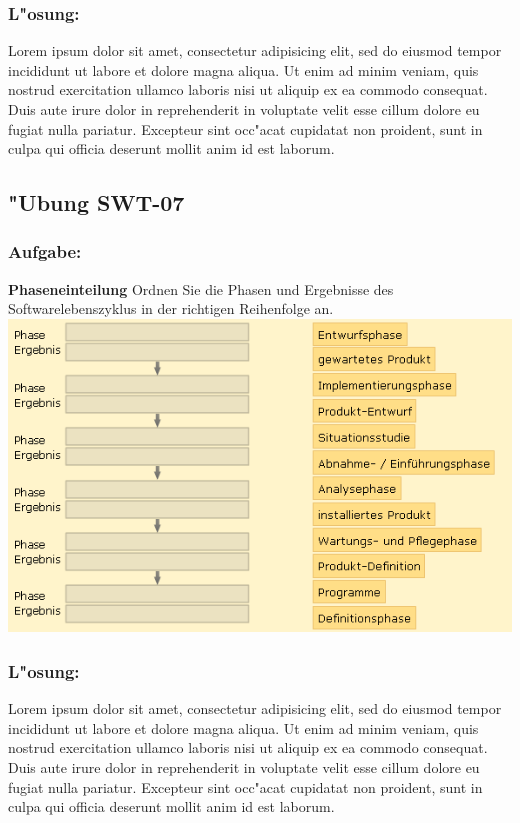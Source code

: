 \subsubsection*{L"osung:}
Lorem ipsum dolor sit amet, consectetur adipisicing elit, sed do eiusmod tempor incididunt ut labore et dolore magna aliqua. Ut enim ad minim veniam, quis nostrud exercitation ullamco laboris nisi ut aliquip ex ea commodo consequat. Duis aute irure dolor in reprehenderit in voluptate velit esse cillum dolore eu fugiat nulla pariatur. Excepteur sint occ"acat cupidatat non proident, sunt in culpa qui officia deserunt mollit anim id est laborum.

\newpage
\subsection{"Ubung SWT-07}
\subsubsection*{Aufgabe:}

\begin{framed}
\textbf{Phaseneinteilung}
\smallbreak
Ordnen Sie die Phasen und Ergebnisse des Softwarelebenszyklus in der richtigen Reihenfolge an.
\bigbreak
\includegraphics[width=1.0\textwidth]{./images/ueb01-07.png}
\end{framed}
\bigbreak
\bigbreak
\subsubsection*{L"osung:}
Lorem ipsum dolor sit amet, consectetur adipisicing elit, sed do eiusmod tempor incididunt ut labore et dolore magna aliqua. Ut enim ad minim veniam, quis nostrud exercitation ullamco laboris nisi ut aliquip ex ea commodo consequat. Duis aute irure dolor in reprehenderit in voluptate velit esse cillum dolore eu fugiat nulla pariatur. Excepteur sint occ"acat cupidatat non proident, sunt in culpa qui officia deserunt mollit anim id est laborum.









